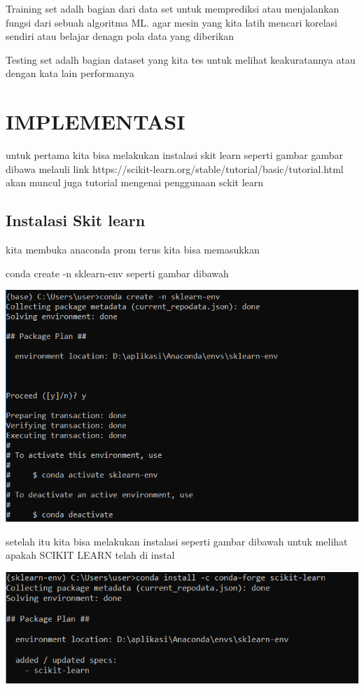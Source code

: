 \documentclass{homework}
\begin{document}
Training set adalh bagian dari data set untuk memprediksi atau menjalankan fungsi dari sebuah algoritma ML. agar mesin yang kita latih mencari korelasi sendiri atau belajar denagn pola data yang diberikan

Testing set adalh bagian dataset yang kita tes untuk melihat keakuratannya atau dengan kata lain performanya



\section{IMPLEMENTASI}
untuk pertama kita bisa melakukan instalasi skit learn seperti gambar gambar dibawa melauli link
https://scikit-learn.org/stable/tutorial/basic/tutorial.html akan muncul juga tutorial mengenai penggunaan sckit learn 
\subsection{Instalasi Skit learn}
kita membuka anaconda prom terus kita bisa memasukkan 

\text conda create -n sklearn-env seperti gambar dibawah
\begin{center}
    \includegraphics[width=.7\textwidth]{Figure/Instal1.PNG}
\end{center}

setelah itu kita bisa melakukan instalasi  seperti gambar dibawah untuk melihat apakah SCIKIT LEARN telah di instal
\begin{center}
    \includegraphics[width=.8\textwidth]{Figure/instal2.PNG}
\end{center}
\end{document}
